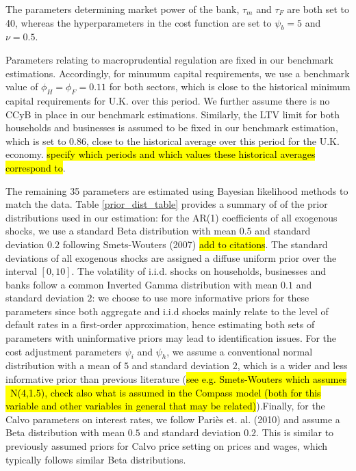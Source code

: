 \documentclass[12pt]{article}
\numberwithin{equation}{section}
\begin{document}
The parameters determining market power of the bank, $\tau_m$ and $\tau_F$ are both set to 40, whereas the hyperparameters in the cost function are set to $\psi_b=5$ and $\nu=0.5$. 

Parameters relating to macroprudential regulation are fixed in our benchmark estimations. Accordingly, for minumum capital requirements, we use a benchmark value of $\phi_H=\phi_F=0.11$ for both sectors, which is close to the historical minimum capital requirements for U.K. over this period. We further assume there is no CCyB in place in our benchmark estimations.  Similarly, the LTV limit for both households and businesses is assumed to be fixed in our benchmark estimation, which is set to $0.86$, close to the historical average over this period for the U.K. economy. \hl{specify which periods and which values these historical averages correspond to}. 


The remaining 35 parameters are estimated using Bayesian likelihood methods to match the data. Table \ref{prior_dist_table} provides a summary of of the prior distributions used in our estimation: for the AR(1) coefficients of all exogenous shocks, we use a standard Beta distribution with mean $0.5$ and standard deviation $0.2$ following Smets-Wouters (2007) \hl{add to citations}. The standard deviations of all exogenous shocks are assigned a diffuse uniform prior over the interval $[0,10]$. The volatility of i.i.d. shocks on households, businesses and banks follow a common Inverted Gamma distribution with mean $0.1$ and standard deviation $2$: we choose to use more informative priors for these parameters since both aggregate and i.i.d shocks mainly relate to the level of default rates in a first-order approximation, hence estimating both sets of parameters with uninformative priors may lead to identification issues. For the cost adjustment parameters $\psi_i$ and $\psi_h$, we assume a conventional normal distribution with a mean of $5$ and standard deviation $2$, which is a wider and less informative prior than previous literature (\hl{see e.g. Smets-Wouters which assumes ~N(4,1.5), check also what is assumed in the Compass model (both for this variable and other variables in general that may be related)}).Finally, for the Calvo parameters on interest rates, we follow Pariès et. al. (2010) and assume a Beta distribution with mean $0.5$ and standard deviation $0.2$. This is similar to previously assumed priors for Calvo price setting on prices and wages, which typically follows similar Beta distributions. 
\end{document}
